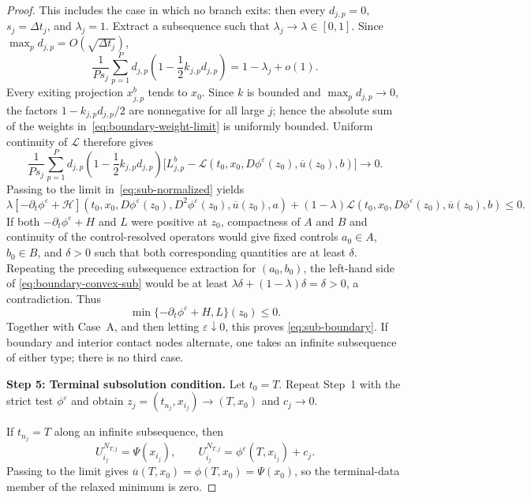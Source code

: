 \documentclass[11pt]{article}
\theoremstyle{definition}
\theoremstyle{remark}
\newcommand{\dt}{\Delta t}
\begin{document}
\begin{proof}
		This includes the case in which no branch exits: then every $d_{j,p}=0$,
		$s_j=\dt_j$, and $\lambda_j=1$.  Extract a subsequence such that
		$\lambda_j\to\lambda\in[0,1]$.  Since
		$\max_p d_{j,p}=O(\sqrt{\dt_j})$,
		\begin{equation}
			\frac1{Ps_j}\sum_{p=1}^P d_{j,p}
			\left(1-\frac12k_{j,p}d_{j,p}\right)
			=1-\lambda_j+o(1).
			\label{eq:boundary-weight-limit}
		\end{equation}
		Every exiting projection $x_{j,p}^b$ tends to $x_0$.  Since $k$ is bounded
		and $\max_p d_{j,p}\to0$, the factors
		$1-k_{j,p}d_{j,p}/2$ are nonnegative for all large $j$; hence the absolute
		sum of the weights in~\eqref{eq:boundary-weight-limit} is uniformly
		bounded.  Uniform continuity of $\mathcal L$ therefore gives
		\[
		\frac1{Ps_j}\sum_{p=1}^P d_{j,p}
		\left(1-\frac12k_{j,p}d_{j,p}\right)
		\bigl[L_{j,p}^b-\mathcal L(t_0,x_0,D\phi^\varepsilon(z_0),
		\overline u(z_0),b)\bigr]\longrightarrow0.
		\]
		Passing to the limit in~\eqref{eq:sub-normalized} yields
		\begin{equation}
			\lambda[-\partial_t\phi^\varepsilon+\mathcal H]
			(t_0,x_0,D\phi^\varepsilon(z_0),D^2\phi^\varepsilon(z_0),
			\overline u(z_0),a)
			+(1-\lambda)\mathcal L(t_0,x_0,D\phi^\varepsilon(z_0),
			\overline u(z_0),b)\le0.
			\label{eq:boundary-convex-sub}
		\end{equation}
		If both $-\partial_t\phi^\varepsilon+H$ and $L$ were positive at $z_0$,
		compactness of $A$ and $B$ and continuity of the control-resolved operators
		would give fixed controls $a_0\in A$, $b_0\in B$, and $\delta>0$ such that
		both corresponding quantities are at least $\delta$.  Repeating the
		preceding subsequence extraction for $(a_0,b_0)$, the left-hand side of
		\eqref{eq:boundary-convex-sub} would be at least
		$\lambda\delta+(1-\lambda)\delta=\delta>0$, a contradiction.  Thus
		\[
		\min\{-\partial_t\phi^\varepsilon+H,L\}(z_0)\le0.
		\]
		Together with Case~A, and then letting $\varepsilon\downarrow0$, this proves
		\eqref{eq:sub-boundary}.  If boundary and interior contact nodes alternate,
		one takes an infinite subsequence of either type; there is no third case.
		
		\medskip
		\noindent\textbf{Step 5: Terminal subsolution condition.}
		Let $t_0=T$.  Repeat Step~1 with the strict test
		$\phi^\varepsilon$ and obtain $z_j=(t_{n_j},x_{i_j})\to(T,x_0)$ and
		$c_j\to0$.
		
		If $t_{n_j}=T$ along an infinite subsequence, then
		\[
		U_{i_j}^{N_{T,j}}=\Psi(x_{i_j}),\qquad
		U_{i_j}^{N_{T,j}}=\phi^\varepsilon(T,x_{i_j})+c_j.
		\]
		Passing to the limit gives
		$\overline u(T,x_0)=\phi(T,x_0)=\Psi(x_0)$, so the terminal-data member of
		the relaxed minimum is zero.
		

\end{proof}
\end{document}
